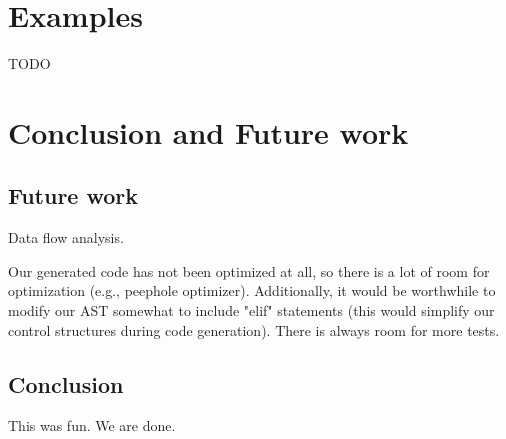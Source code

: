 \documentclass{article}
\begin{document}
\section{Examples}

TODO

\section{Conclusion and Future work}

\subsection{Future work}
Data flow analysis.

Our generated code has not been optimized at all, so there is a lot of room for optimization (e.g., peephole optimizer). Additionally, it would be worthwhile to modify our AST somewhat to include "elif" statements (this would simplify our control structures during code generation). There is always room for more tests.

\subsection{Conclusion}

This was fun. We are done.
\end{document}
